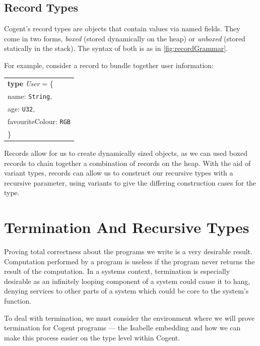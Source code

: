 \subsection{Record Types}

Cogent's record types are objects that contain values via named fields. They come in two forms, \textit{boxed}
(stored dynamically on the heap) or \textit{unboxed} (stored statically in the stack). The syntax of both is
as in \autoref{fig:recordGrammar}.

For example, consider a record to bundle together user information:

\begin{center}
    \begin{tabular}{l}
    \textbf{type} \textit{User} = \{ \\
                    \hspace{1.5em} name: \texttt{String},\\
                    \hspace{1.5em} age: \texttt{U32}, \\
                    \hspace{1.5em} favouriteColour: \texttt{RGB}\\
                    \} \\
    \end{tabular}
\end{center}

Records allow for us to create dynamically sized objects, as we can used boxed records to chain together a
combination of records on the heap. With the aid of variant types, records can allow us to construct 
our recursive types with a recursive parameter, using variants to give the 
differing construction cases for the type.

\section{Termination And Recursive Types}

Proving total correctness about the programs we write is a very desirable result.
Computation performed by a program is useless if the program never returns the
result of the computation.
In a systems context, termination is especially desirable as an infinitely looping component of a
system could cause it to hang, denying services to other parts of a system which could be core to the
system's function.

To deal with termination, we must consider the environment where we will prove termination for
Cogent programs --- the Isabelle embedding and how we can make this process easier on the type
level within Cogent.

